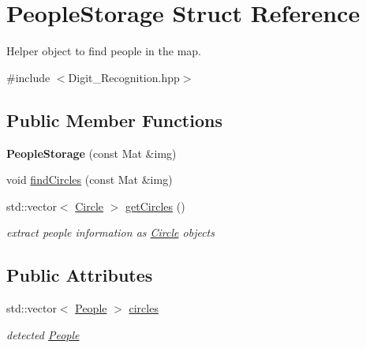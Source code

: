 \hypertarget{struct_people_storage}{}\section{People\+Storage Struct Reference}
\label{struct_people_storage}


Helper object to find people in the map.  




{\ttfamily \#include $<$Digit\+\_\+\+Recognition.\+hpp$>$}

\subsection*{Public Member Functions}
\begin{DoxyCompactItemize}
\item 
\mbox{\label{struct_people_storage_a6aa999011975c71c5dac2c011d0fba4c}} 
{\bfseries People\+Storage} (const Mat \&img)
\item 
void \mbox{\hyperlink{struct_people_storage_a97206f5a49064a68924059861deab436}{find\+Circles}} (const Mat \&img)
\item 
\mbox{\label{struct_people_storage_a0aa9b3323183a3bc56f0e852c7ad1d48}} 
std\+::vector$<$ \mbox{\hyperlink{class_circle}{Circle}} $>$ \mbox{\hyperlink{struct_people_storage_a0aa9b3323183a3bc56f0e852c7ad1d48}{get\+Circles}} ()
\begin{DoxyCompactList}\small\item\em extract people information as \mbox{\hyperlink{class_circle}{Circle}} objects \end{DoxyCompactList}\end{DoxyCompactItemize}
\subsection*{Public Attributes}
\begin{DoxyCompactItemize}
\item 
\mbox{\label{struct_people_storage_a00dd487841221f7b5094934c1409957a}} 
std\+::vector$<$ \mbox{\hyperlink{class_people}{People}} $>$ \mbox{\hyperlink{struct_people_storage_a00dd487841221f7b5094934c1409957a}{circles}}
\begin{DoxyCompactList}\small\item\em detected \mbox{\hyperlink{class_people}{People}} \end{DoxyCompactList}\end{DoxyCompactItemize}


